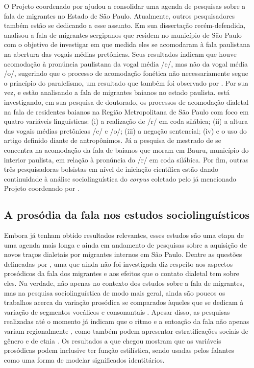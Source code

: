 \documentclass[
	a4paper,	%
	12pt,		%
	]{article}	%
\begin{document}
	O Projeto coordenado por \citet{Oushiro2018} ajudou a consolidar uma agenda de pesquisas sobre a
	fala de migrantes no Estado de São Paulo. Atualmente, outros pesquisadores também estão se
	dedicando a esse assunto. Em sua dissertação recém-defendida, \citet{Santana2019} analisou a
	fala de migrantes sergipanos que residem no município de São Paulo com o objetivo de investigar
	em que medida eles se acomodaram à fala paulistana na abertura das vogais médias pretônicas.
	Seus resultados indicam que houve acomodação à pronúncia paulistana da vogal média /e/, mas não
	da vogal média /o/, sugerindo que o processo de acomodação fonética não necessariamente segue o
	princípio do paralelismo, um resultado que também foi observado por \citet{Oushiro2019}. Por sua
	vez, \citet{Souza2017} e \citet{Oliveira2019} estão analisando a fala de migrantes baianos no
	estado paulista. \citet{Souza2017} está investigando, em sua pesquisa de doutorado, os processos
	de acomodação dialetal na fala de residentes baianos na Região Metropolitana de São Paulo com
	foco em quatro variáveis linguísticas: (i) a realização de /r/ em coda silábica; (ii) a altura
	das vogais médias pretônicas /e/ e /o/; (iii) a negação sentencial; (iv) e o uso do artigo
	definido diante de antropônimos. Já a pesquisa de mestrado de \citet{Oliveira2019} se concentra
	na acomodação da fala de baianos que moram em Bauru, município do interior paulista, em relação
	à pronúncia do /r/ em coda silábica. Por fim, outras três pesquisadoras bolsistas em nível de
	iniciação científica estão dando continuidade à análise sociolinguística do \emph{corpus}
	coletado pelo já mencionado Projeto coordenado por \citet{Oushiro2018}.

	\subsection{A prosódia da fala nos estudos sociolinguísticos} \label{prosodia-socio}

	Embora já tenham obtido resultados relevantes, esses estudos são uma etapa de uma agenda mais
	longa e ainda em andamento de pesquisas sobre a aquisição de novos traços dialetais por
	migrantes internos em São Paulo. Dentre as questões delineadas por \citet{Oushiro2018}, uma que
	ainda não foi investigada diz respeito aos aspectos prosódicos da fala dos migrantes e aos
	efeitos que o contato dialetal tem sobre eles. Na verdade, não apenas no contexto dos estudos
	sobre a fala de migrantes, mas na pesquisa sociolinguística de modo mais geral, ainda são poucos
	os trabalhos acerca da variação prosódica se comparados àqueles que se dedicam à variação de
	segmentos vocálicos e consonantais \citep{Thomas2013, Hay.Drager2007}. Apesar disso, as
	pesquisas realizadas até o momento já indicam que o ritmo e a entoação da fala não apenas variam
	regionalmente \citep{Clopper.Smiljanic2015, Grabe.etal2000}, como também podem apresentar
	estratificações sociais de gênero \citep{Lowry2011} e de etnia \citep{Thomas2013, Szakay2006}.
	Os resultados a que \citet{Podesva2011} chegou mostram que as variáveis prosódicas podem
	inclusive ter função estilística, sendo usadas pelos falantes como uma forma de modelar
	significados identitários.
\end{document}
